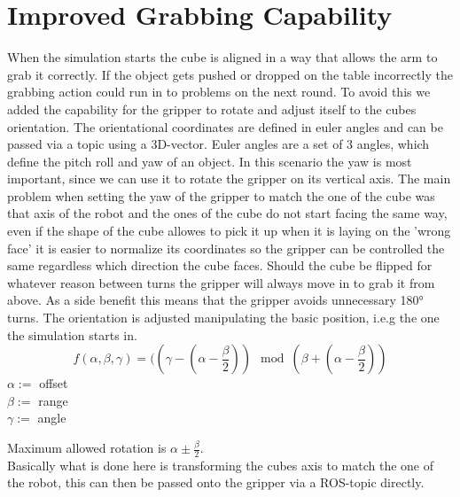 \documentclass[report]{iisthesis}
\begin{document}
\section{Improved Grabbing Capability}
When the simulation starts the cube is aligned in a way that allows the arm to grab it correctly. If the object gets pushed or dropped on the table incorrectly the grabbing action could run in to problems
on the next round. To avoid this we added the capability for the gripper to rotate and adjust itself to the cubes orientation.
The orientational coordinates are defined in euler angles and can be passed via a topic using a 3D-vector.
Euler angles are a set of 3 angles, which define the pitch roll and yaw of an object. In this scenario the yaw is most important, since we can use it to rotate the gripper on its vertical axis.
The main problem when setting the yaw of the gripper to match the one of the cube was that axis of the robot and the ones of the cube do not start facing the same way, even if the shape of the cube allowes 
to pick it up when it is laying on the 'wrong face' it is easier to normalize its coordinates so the gripper can be controlled the same regardless which direction the cube faces. 
Should the cube be flipped for whatever reason between turns the gripper will always move in to grab it from above.
As a side benefit this means that the gripper avoids unnecessary 180° turns.
The orientation is adjusted manipulating the basic position, i.e.g the one the simulation starts in.
$$
f(\alpha, \beta, \gamma) = ((\gamma - (\alpha - \frac{\beta}{2})) \mod (\beta + (\alpha - \frac{\beta}{2}))
$$
$\alpha :=$ offset \\
$\beta :=$ range\\
$\gamma :=$ angle

Maximum allowed rotation is $\alpha \pm \frac{\beta}{2}$. \\
Basically what is done here is transforming the cubes axis to match the one of the robot, this can then be passed onto the gripper via a ROS-topic directly.

\setcounter{chapter}{3}
\setcounter{section}{0}
\end{document}
